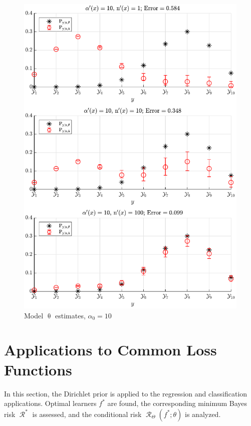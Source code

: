 \documentclass[12pt]{report}
\DeclareMathOperator{\Rcal}{\mathcal{R}}
\begin{document}
\begin{figure}
\centering
\includegraphics[width=0.7\linewidth]{P_yx_error_a0_10.pdf}
\caption{Model $\uptheta$ estimates, $\alpha_0 = 10$}
\label{fig:P_yx_error_a0_10}
\end{figure}
















\section{Applications to Common Loss Functions}

In this section, the Dirichlet prior is applied to the regression and classification applications. Optimal learners $f^*$ are found,  the corresponding minimum Bayes risk $\Rcal^*$ is assessed, and the conditional risk $\Rcal_{\Theta}(f^*;\theta)$ is analyzed.
\end{document}
